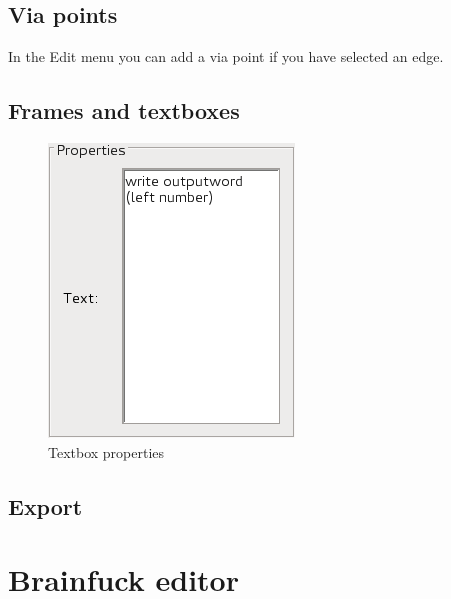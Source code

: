 \documentclass[%
  a4paper,%
  11pt,%
  blue,%
  hyperref	%
  ]{tubsartcl}
\begin{document}
\newpage



\subsection{Via points}
\label{sec:via-points}
In the Edit menu you can add a via point if you have selected an edge.
\subsection{Frames and textboxes}
\label{sec:frames-textboxes}

\begin{figure}[!htb]
\begin{center}
\includegraphics[scale=0.5]{graphics_gui/text_properties.png}
\end{center}
\caption{Textbox properties}
\label{pic:text_properties}
\end{figure}

\newpage

\subsection{Export}
\label{sec:export}

\newpage

\section{Brainfuck editor}
\end{document}

